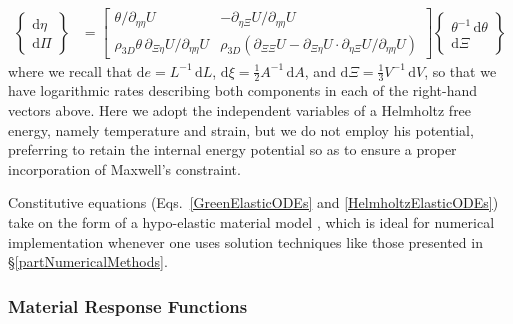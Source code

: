 \begin{subequations}
\begin{align}
    \left\{ \begin{matrix} \mathrm{d} \eta \\ 
    \mathrm{d} \Pi \end{matrix} \right\} & = \begin{bmatrix}
    \theta /\partial_{\eta\eta} U & -\partial_{\eta \Xi} U / \partial_{\eta\eta} U \\
    \rho_{3D} \theta \, \partial_{\Xi\eta} U / \partial_{\eta\eta} U & \rho_{3D} ( \partial_{\Xi\Xi} U - \partial_{\Xi\eta} U \!\cdot\! \partial_{\eta \Xi} U / \partial_{\eta\eta} U ) \end{bmatrix} \left\{ \begin{matrix} \theta^{-1} \, \mathrm{d} \theta \\
    \mathrm{d} \Xi \end{matrix} \right\}
    \end{align}
\end{subequations}
\normalsize
where we recall that $\mathrm{d}e = L^{-1} \, \mathrm{d}L$, $\mathrm{d}\xi = \tfrac{1}{2} A^{-1} \, \mathrm{d}A$, and $\mathrm{d}\Xi = \tfrac{1}{3} V^{-1} \, \mathrm{d}V$, so that we have logarithmic rates describing both components in each of the right-hand vectors above.  Here we adopt the independent variables of a Helmholtz free energy, namely temperature and strain, but we do not employ his potential, preferring to retain the internal energy potential so as to ensure a proper incorporation of Maxwell's constraint. 

Constitutive equations (Eqs.~\ref{GreenElasticODEs} and \ref{HelmholtzElasticODEs}) take on the form of a hypo-elastic material model \cite{Truesdell55}, which is ideal for numerical implementation whenever one uses solution techniques like those presented in \S\ref{partNumericalMethods}.  

\subsubsection{Material Response Functions}

